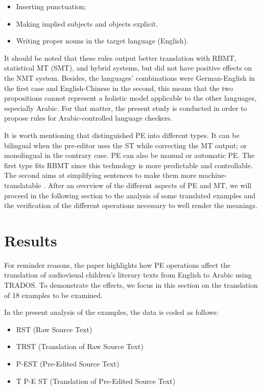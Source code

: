\documentclass[english]{textolivre}
\begin{document}
\begin{itemize}
 \item Inserting punctuation;
 \item Making implied subjects and objects explicit.
 \item Writing proper nouns in the target language (English).
\end{itemize}

It should be noted that these rules output better translation with RBMT, statistical MT (SMT), and hybrid systems, but did not have positive effects on the NMT system. Besides, the languages’ combinations were German-English in the first case and English-Chinese in the second, this means that the two propositions cannot represent a holistic model applicable to the other languages, especially Arabic. For that matter, the present study is conducted in order to propose rules for Arabic-controlled language checkers.

It is worth mentioning that \textcite{hiraoka2019pre} distinguished PE into different types. It can be bilingual when the pre-editor uses the ST while correcting the MT output; or monolingual in the contrary case. PE can also be manual or automatic PE. The first type fits RBMT since this technology is more predictable and controllable. The second aims at simplifying sentences to make them more machine-translatable \cite{miyata_understanding_2021}. After an overview of the different aspects of PE and MT, we will proceed in the following section to the analysis of some translated examples and the verification of the different operations necessary to well render the meanings.

\section{Results}

For reminder reasons, the paper highlights how PE operations affect the translation of audiovisual children’s literary texts from English to Arabic using TRADOS. To demonstrate the effects, we focus in this section on the translation of 18 examples to be examined.

In the present analysis of the examples, the data is coded as follows:

\begin{itemize}
 \item RST (Raw Source Text)
 \item TRST (Translation of Raw Source Text)
 \item P-EST (Pre-Edited Source Text)
 \item T P-E ST (Translation of Pre-Edited Source Text)
\end{itemize}
\end{document}

